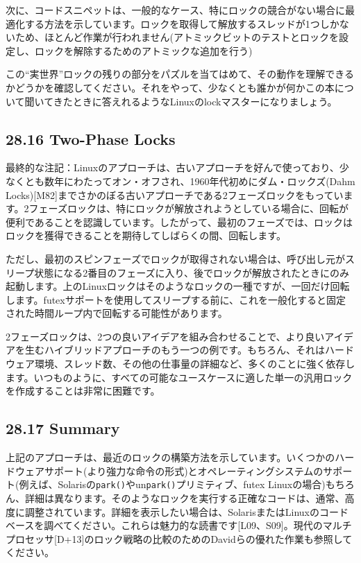 次に、コードスニペットは、一般的なケース、特にロックの競合がない場合に最適化する方法を示しています。ロックを取得して解放するスレッドが1つしかないため、ほとんど作業が行われません(アトミックビットのテストとロックを設定し、ロックを解除するためのアトミックな追加を行う)

この``実世界''ロックの残りの部分をパズルを当てはめて、その動作を理解できるかどうかを確認してください。それをやって、少なくとも誰かが何かこの本について聞いてきたときに答えれるようなLinuxのlockマスターになりましょう。

\hypertarget{two-phase-locks}{%
\subsection*{28.16 Two-Phase Locks}\label{two-phase-locks}}

最終的な注記：Linuxのアプローチは、古いアプローチを好んで使っており、少なくとも数年にわたってオン・オフされ、1960年代初めにダム・ロックズ(Dahm
Locks){[}M82{]}までさかのぼる古いアプローチである2フェーズロックをもっています。2フェーズロックは、特にロックが解放されようとしている場合に、回転が便利であることを認識しています。したがって、最初のフェーズでは、ロックはロックを獲得できることを期待してしばらくの間、回転します。

ただし、最初のスピンフェーズでロックが取得されない場合は、呼び出し元がスリープ状態になる2番目のフェーズに入り、後でロックが解放されたときにのみ起動します。上のLinuxロックはそのようなロックの一種ですが、一回だけ回転します。futexサポートを使用してスリープする前に、これを一般化すると固定された時間ループ内で回転する可能性があります。

2フェーズロックは、2つの良いアイデアを組み合わせることで、より良いアイデアを生むハイブリッドアプローチのもう一つの例です。もちろん、それはハードウェア環境、スレッド数、その他の仕事量の詳細など、多くのことに強く依存します。いつものように、すべての可能なユースケースに適した単一の汎用ロックを作成することは非常に困難です。

\hypertarget{summary-17}{%
\subsection*{28.17 Summary}\label{summary-17}}

上記のアプローチは、最近のロックの構築方法を示しています。いくつかのハードウェアサポート(より強力な命令の形式)とオペレーティングシステムのサポート(例えば、Solarisの\texttt{park()}やun\texttt{park()}プリミティブ、futex
Linuxの場合)もちろん、詳細は異なります。そのようなロックを実行する正確なコードは、通常、高度に調整されています。詳細を表示したい場合は、SolarisまたはLinuxのコードベースを調べてください。これらは魅力的な読書です{[}L09、S09{]}。現代のマルチプロセッサ{[}D+13{]}のロック戦略の比較のためのDavidらの優れた作業も参照してください。

